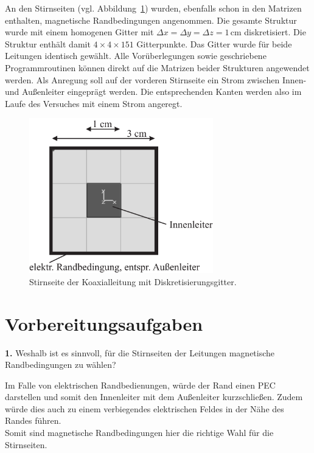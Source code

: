 \documentclass[Protokollheft.tex]{subfiles}
\begin{document}
    An den Stirnseiten (vgl. Abbildung~\ref{b3}) wurden, ebenfalls schon in den Matrizen
    enthalten, magnetische Randbedingungen angenommen. Die gesamte
    Struktur wurde mit einem homogenen Gitter mit $\Delta x = \Delta y
    = \Delta z = 1\,\text{cm}$ diskretisiert. Die Struktur enthält damit $4
    \times 4 \times 151$ Gitterpunkte.
    Das Gitter wurde für beide Leitungen identisch gewählt. Alle
    Vorüberlegungen sowie geschriebene Programmroutinen können direkt
    auf die Matrizen beider Strukturen angewendet werden. Als Anregung soll auf der vorderen Stirnseite ein Strom zwischen Innen- und Außenleiter eingeprägt werden. Die entsprechenden Kanten werden also im Laufe des Versuches mit einem Strom angeregt.
    \begin{figure}[h]
        \begin{center}
        \includegraphics[width=8cm]{v7_mesh.pdf}
        \caption{Stirnseite der Koaxialleitung mit Diskretisierungsgitter.}\label{b3}
        \end{center}
    \end{figure}
    \newpage

\section{Vorbereitungsaufgaben}

\begin{framed}
	\noindent \textbf{1.} Weshalb ist es sinnvoll, für die Stirnseiten der Leitungen
magnetische Randbedingungen zu wählen?\label{exer:bound4frontOfLine}
\end{framed}
Im Falle von elektrischen Randbedienungen, würde der Rand einen PEC darstellen und somit den Innenleiter mit dem Außenleiter kurzschließen. Zudem würde dies auch zu einem \glqq verbiegen\grqq des elektrischen Feldes in der Nähe des Randes führen. \\
Somit sind magnetische Randbedingungen hier die richtige Wahl für die Stirnseiten. 
\end{document}
